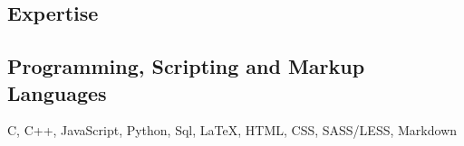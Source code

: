 \documentclass[11pt, oneside, a4paper, titlepage]{article}
\begin{document}
\begin{tcolorbox}
\begin{minipage}[t]{8cm}
\begin{tcolorbox}[grow to left by=0.6cm,colback=gray!25,colframe=white]
      \section*{Expertise}
        \subsection{Programming, Scripting and Markup Languages}
        C, C++, JavaScript, Python, Sql, {\LaTeX}, HTML, CSS, SASS/LESS, Markdown

    \end{tcolorbox}
  \end{minipage}
\end{tcolorbox}
\end{document}
